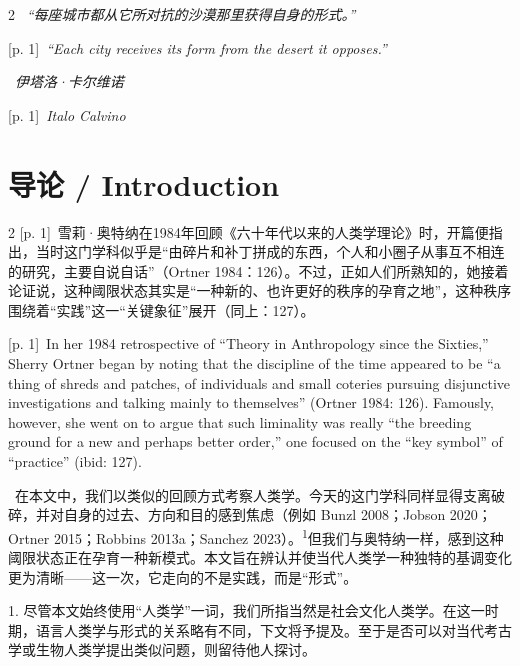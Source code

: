 \documentclass[10pt,a4paper]{article}
\begin{document}
\begin{paracol}{2}
\switchcolumn*
{\scriptsize\color{gray} [p. 1]}\ \textit{“每座城市都从它所对抗的沙漠那里获得自身的形式。”}\par
\switchcolumn
{\scriptsize\color{gray} [p. 1]}\ \textit{“Each city receives its form from the desert it opposes.”}\par
\switchcolumn*
{\scriptsize\color{gray} [p. 1]}\ \textit{伊塔洛·卡尔维诺}\par
\switchcolumn
{\scriptsize\color{gray} [p. 1]}\ \textit{Italo Calvino}\par
\switchcolumn*
\end{paracol}
\section*{导论 / Introduction}
\begin{paracol}{2}
{\scriptsize\color{gray} [p. 1]}\ 雪莉·奥特纳在1984年回顾《六十年代以来的人类学理论》时，开篇便指出，当时这门学科似乎是“由碎片和补丁拼成的东西，个人和小圈子从事互不相连的研究，主要自说自话”（Ortner 1984：126）。不过，正如人们所熟知的，她接着论证说，这种阈限状态其实是“一种新的、也许更好的秩序的孕育之地”，这种秩序围绕着“实践”这一“关键象征”展开（同上：127）。\par
\switchcolumn
{\scriptsize\color{gray} [p. 1]}\ In her 1984 retrospective of “Theory in Anthropology since the Sixties,” Sherry Ortner began by noting that the discipline of the time appeared to be “a thing of shreds and patches, of individuals and small coteries pursuing disjunctive investigations and talking mainly to themselves” (Ortner 1984: 126). Famously, however, she went on to argue that such liminality was really “the breeding ground for a new and perhaps better order,” one focused on the “key symbol” of “practice” (ibid: 127).\par
\switchcolumn*
{\scriptsize\color{gray} [p. 2]}\ 在本文中，我们以类似的回顾方式考察人类学。今天的这门学科同样显得支离破碎，并对自身的过去、方向和目的感到焦虑（例如 Bunzl 2008；Jobson 2020；Ortner 2015；Robbins 2013a；Sanchez 2023）。\textsuperscript{1}但我们与奥特纳一样，感到这种阈限状态正在孕育一种新模式。本文旨在辨认并使当代人类学一种独特的基调变化更为清晰——这一次，它走向的不是实践，而是“形式”。\par{\small 1. 尽管本文始终使用“人类学”一词，我们所指当然是社会文化人类学。在这一时期，语言人类学与形式的关系略有不同，下文将予提及。至于是否可以对当代考古学或生物人类学提出类似问题，则留待他人探讨。\par}
\switchcolumn

\end{paracol}
\end{document}
